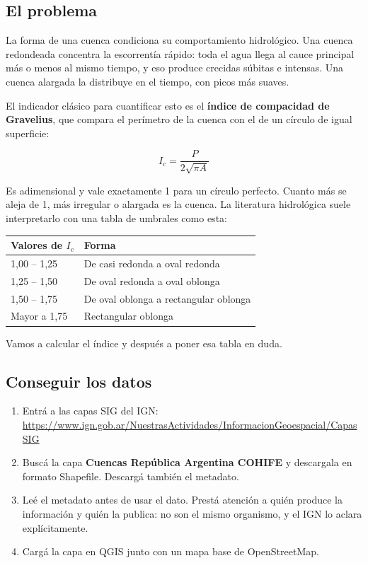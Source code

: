 \documentclass{article}
\begin{document}
\subsection{El problema}

La forma de una cuenca condiciona su comportamiento hidrológico. Una cuenca redondeada concentra la escorrentía rápido: toda el agua llega al cauce principal más o menos al mismo tiempo, y eso produce crecidas súbitas e intensas. Una cuenca alargada la distribuye en el tiempo, con picos más suaves.

El indicador clásico para cuantificar esto es el \textbf{índice de compacidad de Gravelius}, que compara el perímetro de la cuenca con el de un círculo de igual superficie:

\begin{equation*}
    I_c = \frac{P}{2\sqrt{\pi A}}
\end{equation*}

Es adimensional y vale exactamente 1 para un círculo perfecto. Cuanto más se aleja de 1, más irregular o alargada es la cuenca. La literatura hidrológica suele interpretarlo con una tabla de umbrales como esta:

\begin{center}
\begin{tabular}{ll}
    \toprule
    Valores de $I_c$ & Forma \\
    \midrule
    1,00 -- 1,25 & De casi redonda a oval redonda \\
    1,25 -- 1,50 & De oval redonda a oval oblonga \\
    1,50 -- 1,75 & De oval oblonga a rectangular oblonga \\
    Mayor a 1,75 & Rectangular oblonga \\
    \bottomrule
\end{tabular}
\end{center}

Vamos a calcular el índice y después a poner esa tabla en duda.

\subsection{Conseguir los datos}

\begin{enumerate}
    \item Entrá a las capas SIG del IGN:\\
    \url{https://www.ign.gob.ar/NuestrasActividades/InformacionGeoespacial/CapasSIG}
    \item Buscá la capa \textbf{Cuencas República Argentina COHIFE} y descargala en formato Shapefile. Descargá también el metadato.
    \item Leé el metadato antes de usar el dato. Prestá atención a quién produce la información y quién la publica: no son el mismo organismo, y el IGN lo aclara explícitamente.
    \item Cargá la capa en QGIS junto con un mapa base de OpenStreetMap.
\end{enumerate}
\end{document}
